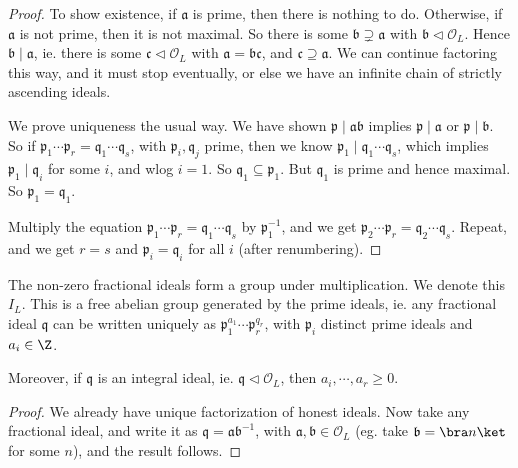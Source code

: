 \documentclass[a4paper]{article}
\begin{document}
\begin{proof}
  To show existence, if $\mathfrak{a}$ is prime, then there is nothing to do. Otherwise, if $\mathfrak{a}$ is not prime, then it is not maximal. So there is some $\mathfrak{b} \supsetneq \mathfrak{a}$ with $\mathfrak{b} \lhd \mathcal{O}_L$. Hence $\mathfrak{b} \mid \mathfrak{a}$, ie. there is some $\mathfrak{c} \lhd \mathcal{O}_L$ with $\mathfrak{a} = \mathfrak{b} \mathfrak{c}$, and $\mathfrak{c} \supseteq \mathfrak{a}$. We can continue factoring this way, and it must stop eventually, or else we have an infinite chain of strictly ascending ideals.

  We prove uniqueness the usual way. We have shown $\mathfrak{p} \mid \mathfrak{a}\mathfrak{b}$ implies $\mathfrak{p} \mid \mathfrak{a}$ or $\mathfrak{p} \mid \mathfrak{b}$. So if $\mathfrak{p}_1 \cdots \mathfrak{p}_r = \mathfrak{q}_1 \cdots \mathfrak{q}_s$, with $\mathfrak{p}_i, \mathfrak{q}_j$ prime, then we know $\mathfrak{p}_1 \mid \mathfrak{q}_1 \cdots \mathfrak{q}_s$, which implies $\mathfrak{p}_1 \mid \mathfrak{q}_i$ for some $i$, and wlog $i = 1$. So $\mathfrak{q}_1 \subseteq \mathfrak{p}_1$. But $\mathfrak{q}_1$ is prime and hence maximal. So $\mathfrak{p}_1 = \mathfrak{q}_1$.

  Multiply the equation $\mathfrak{p}_1 \cdots \mathfrak{p}_r = \mathfrak{q}_1 \cdots \mathfrak{q}_s$ by $\mathfrak{p}_1^{-1}$, and we get $\mathfrak{p}_2 \cdots \mathfrak{p}_r = \mathfrak{q}_2 \cdots \mathfrak{q}_s$. Repeat, and we get $r = s$ and $\mathfrak{p}_i = \mathfrak{q}_i$ for all $i$ (after renumbering).
\end{proof}

\begin{cor}
  The non-zero fractional ideals form a group under multiplication. We denote this $I_L$. This is a free abelian group generated by the prime ideals, ie. any fractional ideal $\mathfrak{q}$ can be written uniquely as $\mathfrak{p}_1^{a_1} \cdots \mathfrak{p}_r^{q_r}$, with $\mathfrak{p}_i$ distinct prime ideals and $a_i \in \Z$.

  Moreover, if $\mathfrak{q}$ is an integral ideal, ie. $\mathfrak{q} \lhd \mathcal{O}_L$, then $a_i, \cdots, a_r \geq 0$.
\end{cor}

\begin{proof}
  We already have unique factorization of honest ideals. Now take any fractional ideal, and write it as $\mathfrak{q} = \mathfrak{a} \mathfrak{b}^{-1}$, with $\mathfrak{a}, \mathfrak{b} \in \mathcal{O}_L$ (eg. take $\mathfrak{b} = \bra n\ket$ for some $n$), and the result follows.
\end{proof}
\end{document}

